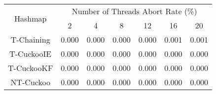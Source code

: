 \begin{tabular}{|c|c|c|c|c|c|c|}
\hline
\multirow{2}{*}{Hashmap} & \multicolumn{6}{c|}{Number of Threads Abort Rate (\%)}\\\cline{2-7}& 2 & 4 & 8 & 12 & 16 & 20\\
\hline
\hline
T-Chaining & 0.000 & 0.000 & 0.000 & 0.000 & 0.001 & 0.001\\
T-CuckooIE & 0.000 & 0.000 & 0.000 & 0.000 & 0.000 & 0.000\\
T-CuckooKF & 0.000 & 0.000 & 0.000 & 0.000 & 0.000 & 0.000\\
NT-Cuckoo & 0.000 & 0.000 & 0.000 & 0.000 & 0.000 & 0.000\\
\hline
\end{tabular}
